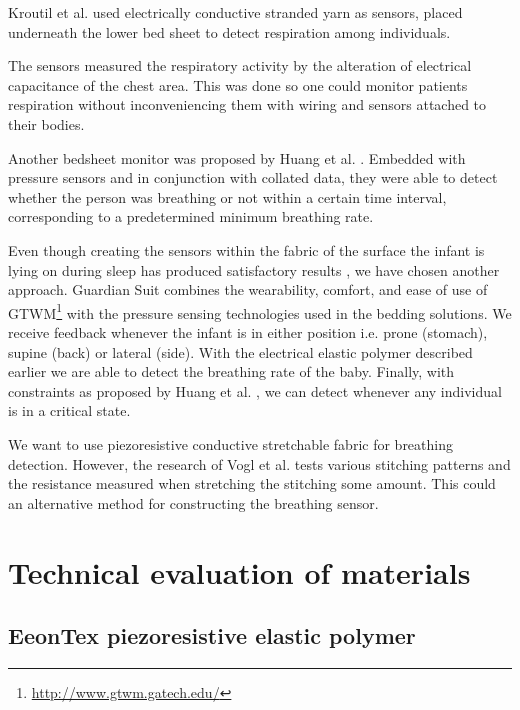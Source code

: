 \documentclass{sigchi-ext}
\begin{document}
Kroutil et al. \cite{a33-kroutil} used electrically conductive stranded yarn as sensors, placed underneath the lower bed sheet to detect respiration among individuals. 

The sensors measured the respiratory activity by the alteration of electrical capacitance of the chest area. This was done so one could monitor patients respiration without inconveniencing them with wiring and sensors attached to their bodies.

Another bedsheet monitor was proposed by Huang et al. \cite{a18-huang}. Embedded with pressure sensors and in conjunction with collated data, they were able to detect whether the person was breathing or not within a certain time interval, corresponding to a predetermined minimum breathing rate.

Even though creating the sensors within the fabric of the surface the infant is lying on during sleep has produced satisfactory results \cite{a18-huang, a33-kroutil}, we have chosen another approach. Guardian Suit combines the wearability, comfort, and ease of use of GTWM\footnote{\url{http://www.gtwm.gatech.edu/}} \cite{p285-fantauzzacoffin} with the pressure sensing technologies used in the bedding solutions. We receive feedback whenever the infant is in either position i.e. prone (stomach), supine (back) or lateral (side). With the electrical elastic polymer described earlier we are able to detect the breathing rate of the baby. Finally, with constraints as proposed by Huang et al. \cite{a18-huang}, we can detect whenever any individual is in a critical state.

We want to use piezoresistive conductive
stretchable fabric for breathing detection. However, the 
research of Vogl et al. \cite{stretcheband}
tests various stitching patterns and the resistance measured
when stretching the stitching some amount. This could an 
alternative method for constructing the breathing sensor.


\clearpage

\section{Technical evaluation of materials}

\subsection{EeonTex piezoresistive elastic polymer}
\end{document}
